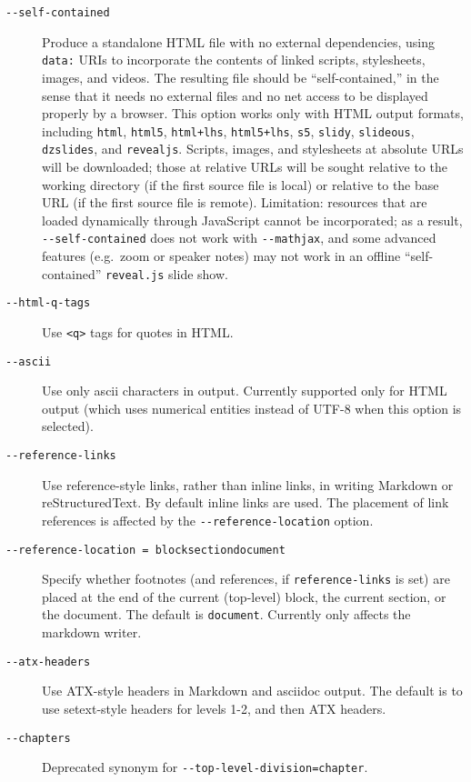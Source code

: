 \documentclass[]{article}
\begin{document}
\begin{description}
\item[\texttt{-\/-self-contained}]
Produce a standalone HTML file with no external dependencies, using
\texttt{data:} URIs to incorporate the contents of linked scripts,
stylesheets, images, and videos. The resulting file should be
``self-contained,'' in the sense that it needs no external files and no
net access to be displayed properly by a browser. This option works only
with HTML output formats, including \texttt{html}, \texttt{html5},
\texttt{html+lhs}, \texttt{html5+lhs}, \texttt{s5}, \texttt{slidy},
\texttt{slideous}, \texttt{dzslides}, and \texttt{revealjs}. Scripts,
images, and stylesheets at absolute URLs will be downloaded; those at
relative URLs will be sought relative to the working directory (if the
first source file is local) or relative to the base URL (if the first
source file is remote). Limitation: resources that are loaded
dynamically through JavaScript cannot be incorporated; as a result,
\texttt{-\/-self-contained} does not work with \texttt{-\/-mathjax}, and
some advanced features (e.g.~zoom or speaker notes) may not work in an
offline ``self-contained'' \texttt{reveal.js} slide show.
\item[\texttt{-\/-html-q-tags}]
Use \texttt{\textless{}q\textgreater{}} tags for quotes in HTML.
\item[\texttt{-\/-ascii}]
Use only ascii characters in output. Currently supported only for HTML
output (which uses numerical entities instead of UTF-8 when this option
is selected).
\item[\texttt{-\/-reference-links}]
Use reference-style links, rather than inline links, in writing Markdown
or reStructuredText. By default inline links are used. The placement of
link references is affected by the \texttt{-\/-reference-location}
option.
\item[\texttt{-\/-reference-location\ =\ block}\textbar{}\texttt{section}\textbar{}\texttt{document}]
Specify whether footnotes (and references, if \texttt{reference-links}
is set) are placed at the end of the current (top-level) block, the
current section, or the document. The default is \texttt{document}.
Currently only affects the markdown writer.
\item[\texttt{-\/-atx-headers}]
Use ATX-style headers in Markdown and asciidoc output. The default is to
use setext-style headers for levels 1-2, and then ATX headers.
\item[\texttt{-\/-chapters}]
Deprecated synonym for \texttt{-\/-top-level-division=chapter}.

\end{description}
\end{document}
